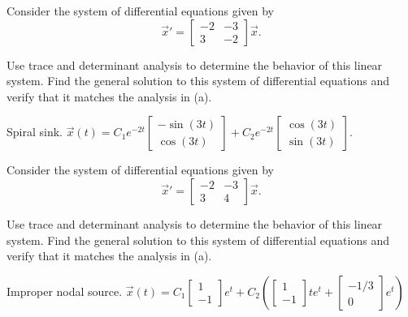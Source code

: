 \begin{exercise}
Consider the system of differential equations given by 
\begin{equation*}
{\vec{x}}'  = \begin{bmatrix} -2 & -3 \\ 3 & -2 \end{bmatrix} \vec{x}.
\end{equation*}
\begin{tasks}
\task Use trace and determinant analysis to determine the behavior of this linear system.
\task Find the general solution to this system of differential equations and verify that it matches the analysis in (a).
\end{tasks}
\end{exercise}
\comboSol{%
}
{%
Spiral sink. $\vec{x}(t) = C_1e^{-2t}\left[\begin{smallmatrix} -\sin(3t) \\ \cos(3t) \end{smallmatrix}\right] + C_2e^{-2t} \left[\begin{smallmatrix} \cos(3t) \\ \sin(3t) \end{smallmatrix}\right]$.
}

\begin{exercise}
Consider the system of differential equations given by 
\begin{equation*}
{\vec{x}}'  = \begin{bmatrix} -2 & -3 \\ 3 & 4 \end{bmatrix} \vec{x}.
\end{equation*}
\begin{tasks}
\task Use trace and determinant analysis to determine the behavior of this linear system.
\task Find the general solution to this system of differential equations and verify that it matches the analysis in (a).
\end{tasks}
\end{exercise}
\comboSol{%
}
{%
Improper nodal source. $\vec{x}(t) = C_1 \left[\begin{smallmatrix} 1 \\ -1 \end{smallmatrix}\right]e^t + C_2\left(\left[\begin{smallmatrix} 1 \\ -1 \end{smallmatrix}\right]te^t + \left[\begin{smallmatrix} -1/3 \\ 0 \end{smallmatrix}\right]e^t \right)$
}

